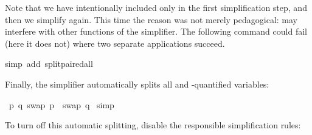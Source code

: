 \begin{isabellebody}
%
\endisatagproof
{\isafoldproof}%
%
\isadelimproof
%
\endisadelimproof
%
\begin{isamarkuptext}%
\noindent
Note that we have intentionally included only 
in the first simplification step, and then we simplify again. 
This time the reason was not merely
pedagogical:
 may interfere with other functions
of the simplifier.
The following command could fail (here it does not)
where two separate  applications succeed.%
\end{isamarkuptext}%
\isamarkuptrue%
%
\isadelimproof
%
\endisadelimproof
%
\isatagproof
{}\isamarkupfalse%
{}simp\ add{}\ split{}paired{}all{}%
\endisatagproof
{\isafoldproof}%
%
\isadelimproof
%
\endisadelimproof
%
\begin{isamarkuptext}%
\noindent
Finally, the simplifier automatically splits all  and
-quantified variables:%
\end{isamarkuptext}%
\isamarkuptrue%
\isamarkupfalse%
\ {}{}p{}\ {}q{}\ swap\ p\ {}\ swap\ q{}\isanewline
%
\isadelimproof
%
\endisadelimproof
%
\isatagproof
{}\isamarkupfalse%
\ simp%
\endisatagproof
{\isafoldproof}%
%
\isadelimproof
%
\endisadelimproof
%
\begin{isamarkuptext}%
\noindent
To turn off this automatic splitting, disable the
responsible simplification rules:
\begin{center}

\end{center}
\end{isamarkuptext}
\end{isabellebody}
